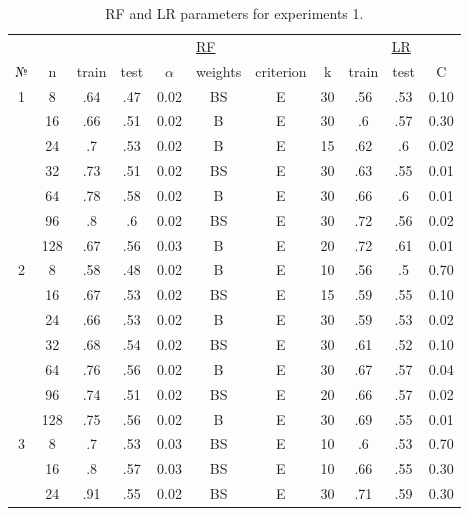 \begin{table}
\centering
\caption{RF and LR parameters for experiments 1.}
\label{tab:params_1_rf_lr}
\begin{tabular}{|c|c|cccccc||ccc|}\hline
& & \multicolumn{6}{c||}{\underline{RF}} & \multicolumn{3}{c|}{\underline{LR}}\\
№ &   n & train & test & $\alpha$ & weights & criterion &  k & train & test &    C \\\hline
1 &   8 &   .64 &  .47 &     0.02 &      BS &         E & 30 &   .56 &  .53 & 0.10 \\
  &  16 &   .66 &  .51 &     0.02 &       B &         E & 30 &    .6 &  .57 & 0.30 \\
  &  24 &    .7 &  .53 &     0.02 &       B &         E & 15 &   .62 &   .6 & 0.02 \\
  &  32 &   .73 &  .51 &     0.02 &      BS &         E & 30 &   .63 &  .55 & 0.01 \\
  &  64 &   .78 &  .58 &     0.02 &       B &         E & 30 &   .66 &   .6 & 0.01 \\
  &  96 &    .8 &   .6 &     0.02 &      BS &         E & 30 &   .72 &  .56 & 0.02 \\
  & 128 &   .67 &  .56 &     0.03 &       B &         E & 20 &   .72 &  .61 & 0.01 \\\hline
2 &   8 &   .58 &  .48 &     0.02 &       B &         E & 10 &   .56 &   .5 & 0.70 \\
  &  16 &   .67 &  .53 &     0.02 &      BS &         E & 15 &   .59 &  .55 & 0.10 \\
  &  24 &   .66 &  .53 &     0.02 &       B &         E & 30 &   .59 &  .53 & 0.02 \\
  &  32 &   .68 &  .54 &     0.02 &      BS &         E & 30 &   .61 &  .52 & 0.10 \\
  &  64 &   .76 &  .56 &     0.02 &       B &         E & 30 &   .67 &  .57 & 0.04 \\
  &  96 &   .74 &  .51 &     0.02 &      BS &         E & 20 &   .66 &  .57 & 0.02 \\
  & 128 &   .75 &  .56 &     0.02 &       B &         E & 30 &   .69 &  .55 & 0.01 \\\hline
3 &   8 &    .7 &  .53 &     0.03 &      BS &         E & 10 &    .6 &  .53 & 0.70 \\
  &  16 &    .8 &  .57 &     0.03 &      BS &         E & 10 &   .66 &  .55 & 0.30 \\
  &  24 &   .91 &  .55 &     0.02 &      BS &         E & 30 &   .71 &  .59 & 0.30 \\

\end{tabular}
\end{table}
